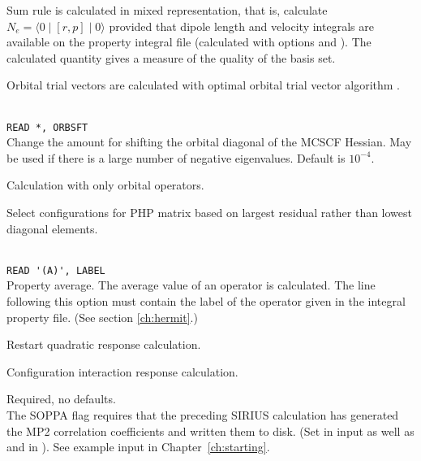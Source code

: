 \begin{description}
\item{}
Sum rule is calculated in mixed representation, that is, calculate
$N_e=\langle0\mid [r,p] \mid0\rangle$ provided that dipole length and
velocity integrals are available on the property integral file 
(calculated with  options  and ).
The calculated quantity gives a measure of the quality of the basis
set.

\item{}
Orbital trial vectors are calculated with optimal orbital
trial vector
algorithm \cite{tuhjahjajpjjcp84}.

\item{}\\
\verb|READ *, ORBSFT|\\
Change the amount for shifting the orbital diagonal of the MCSCF Hessian.
May be used if there is a large number of negative eigenvalues.
Default is $10^{-4}$. 

\item{}
Calculation with only orbital operators. 

\item{}
Select configurations for PHP matrix based on largest residual
rather than lowest diagonal elements.

\item{} \\
\verb|READ '(A)', LABEL|\\
Property average. The average value of an
operator is calculated. 
The line following this option must contain the
label of the operator given in the integral property file.
(See section \ref{ch:hermit}.)

\item{}
Restart quadratic response calculation.

\item{}
Configuration interaction
response calculation. 

\item{}
Required, no defaults. \\
The SOPPA flag requires that
the preceding SIRIUS calculation has generated the MP2 correlation
coefficients and written them to disk. (Set  in 
input as well as  and  in ). See
example input in Chapter~\ref{ch:starting}.


\end{description}
